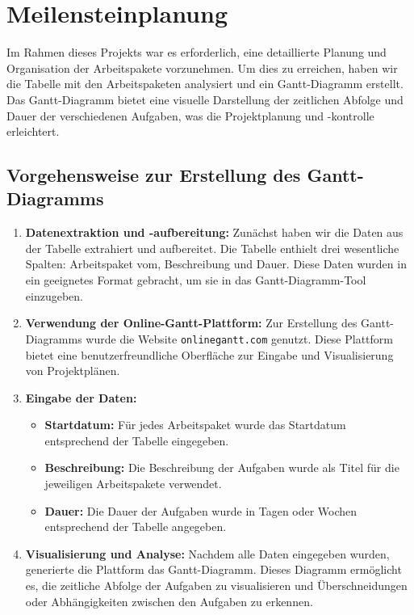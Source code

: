 \chapter{Meilensteinplanung}
Im Rahmen dieses Projekts war es erforderlich, eine detaillierte Planung und Organisation der Arbeitspakete vorzunehmen. Um dies zu erreichen, haben wir die Tabelle mit den Arbeitspaketen analysiert und ein Gantt-Diagramm erstellt. Das Gantt-Diagramm bietet eine visuelle Darstellung der zeitlichen Abfolge und Dauer der verschiedenen Aufgaben, was die Projektplanung und -kontrolle erleichtert.

\section{Vorgehensweise zur Erstellung des Gantt-Diagramms}
\begin{enumerate}
    \item \textbf{Datenextraktion und -aufbereitung:} Zunächst haben wir die Daten aus der Tabelle extrahiert und aufbereitet. Die Tabelle enthielt drei wesentliche Spalten: Arbeitspaket vom, Beschreibung und Dauer. Diese Daten wurden in ein geeignetes Format gebracht, um sie in das Gantt-Diagramm-Tool einzugeben.
    
    \item \textbf{Verwendung der Online-Gantt-Plattform:} Zur Erstellung des Gantt-Diagramms wurde die Website \texttt{onlinegantt.com} genutzt. Diese Plattform bietet eine benutzerfreundliche Oberfläche zur Eingabe und Visualisierung von Projektplänen.
    
    \item \textbf{Eingabe der Daten:}
    \begin{itemize}
        \item \textbf{Startdatum:} Für jedes Arbeitspaket wurde das Startdatum entsprechend der Tabelle eingegeben.
        \item \textbf{Beschreibung:} Die Beschreibung der Aufgaben wurde als Titel für die jeweiligen Arbeitspakete verwendet.
        \item \textbf{Dauer:} Die Dauer der Aufgaben wurde in Tagen oder Wochen entsprechend der Tabelle angegeben.
    \end{itemize}
    
    \item \textbf{Visualisierung und Analyse:} Nachdem alle Daten eingegeben wurden, generierte die Plattform das Gantt-Diagramm. Dieses Diagramm ermöglicht es, die zeitliche Abfolge der Aufgaben zu visualisieren und Überschneidungen oder Abhängigkeiten zwischen den Aufgaben zu erkennen.
\end{enumerate}

